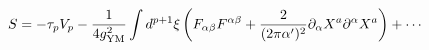 \begin{equation}
S =-\tau_pV_p  -\frac{1}{4g_{{\rm YM}}^2}
 \int d^{p + 1} \xi
\left(F_{\alpha \beta} F^{\alpha \beta} +\frac{2}{(2 \pi \alpha')^2} 
\partial_\alpha X^a \partial^\alpha X^a\right) +\cdots
\label{eq:action-expansion}
\end{equation}

